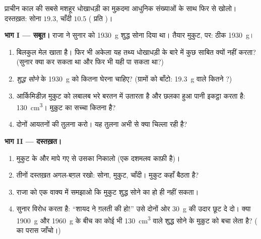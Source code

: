 \begin{problem}\label{pb:g6:density-floating:1}
प्राचीन काल की सबसे मशहूर धोखाधड़ी का मुक़दमा आधुनिक संख्याओं के साथ
फिर से खोलो। दस्तख़त: सोना $19.3$, चाँदी $10.5$ ( प्रति )।

\medskip\noindent\textbf{भाग I --- सबूत।}
राजा ने सुनार को \qty{1930}{g} शुद्ध सोना दिया था। तैयार मुकुट, 
पर: ठीक \qty{1930}{g}।
\begin{enumerate}
  \item {} बिलकुल मेल खाता है। फिर भी अकेला यह तथ्य धोखाधड़ी के
        बारे में कुछ साबित क्यों नहीं करता? (सुनार क्या कर सकता था
        और फिर भी यही  पा सकता था?)
  \item \emph{शुद्ध सोने} के \qty{1930}{g} को कितना  घेरना
        चाहिए? (ग्रामों को बाँटो: \qty{19.3}{g} वाले कितने ?)
  \item आर्किमिडीज़ मुकुट को लबालब भरे बरतन में उतारता है और छलका हुआ
        पानी इकट्ठा करता है: \qty{130}{cm^3}। मुकुट का सच्चा 
        कितना है?
  \item दोनों आयतनों की तुलना करो। यह तुलना अभी से क्या चिल्ला रही
        है?
\end{enumerate}

\medskip\noindent\textbf{भाग II --- दस्तख़त।}
\begin{enumerate}[resume]
  \item मुकुट के  और मापे गए  से उसका  निकालो (एक
        दशमलव काफ़ी है)।
  \item तीनों दस्तख़त अगल-बग़ल रखो: सोना, मुकुट, चाँदी। मुकुट कहाँ
        बैठता है?
  \item राजा को एक वाक्य में समझाओ कि मुकुट शुद्ध सोने का हो ही नहीं
        सकता।
  \item सुनार विरोध करता है: ``शायद  ने ग़लती की हो!'' उसे दोनों
        ओर \qty{30}{g} की उदार छूट दे दो। क्या \qty{1900}{g} और
        \qty{1960}{g} के बीच का कोई भी  \qty{130}{cm^3}
         वाले शुद्ध सोने के मुकुट को बचा लेता है? ( का
        परास जाँचो।)
\end{enumerate}


\end{problem}
